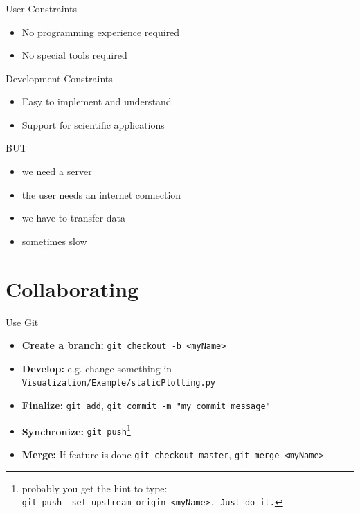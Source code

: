 \documentclass[11pt]{beamer}
\newcommand{\cmark}{\ding{51}}%
\newcommand{\citem}{\item[\textcolor{olive}{\cmark}]}
\newcommand{\mytexttt}[1]{\colorbox{gray!20}{\texttt{#1}}}
\begin{document}
\begin{frame}
\frametitle{\insertsubsection}
\begin{block}{User Constraints}
\begin{itemize}
\citem No programming experience required
\citem No special tools required
\end{itemize}
\end{block}

\begin{block}{Development Constraints}
\begin{itemize}
\citem Easy to implement and understand
\citem Support for scientific applications
\end{itemize}
\end{block}

\begin{block}{BUT}
\begin{itemize}
\item we need a server
\item the user needs an internet connection
\item we have to transfer data
\item sometimes slow
\end{itemize}
\end{block}
\end{frame}

\section{Collaborating}

\begin{frame}
\begin{block}{Use Git}
\begin{itemize}
\item \textbf{Create a branch:} \mytexttt{git checkout -b <myName>}
\item \textbf{Develop:} e.g. change something in \mytexttt{Visualization/Example/staticPlotting.py}
\item \textbf{Finalize:} \mytexttt{git add}, \mytexttt{git commit -m "my commit message"}
\item \textbf{Synchronize:} \mytexttt{git push}\footnote{probably you get the hint to type:\\
\mytexttt{git push --set-upstream origin <myName>. Just do it.}}
\item \textbf{Merge:} If feature is done \mytexttt{git checkout master}, \mytexttt{git merge <myName>}
\end{itemize}
\end{block}
\end{frame}
\end{document}
